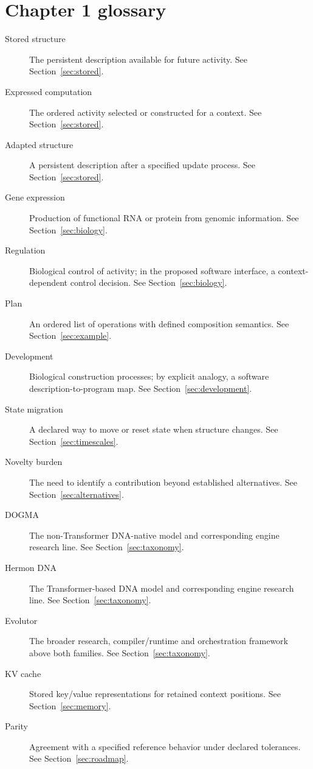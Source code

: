\chapter*{Chapter 1 glossary}
\begin{description}
\item[Stored structure] The persistent description available for future activity. See Section~\ref{sec:stored}.
\item[Expressed computation] The ordered activity selected or constructed for a context. See Section~\ref{sec:stored}.
\item[Adapted structure] A persistent description after a specified update process. See Section~\ref{sec:stored}.
\item[Gene expression] Production of functional RNA or protein from genomic information. See Section~\ref{sec:biology}.
\item[Regulation] Biological control of activity; in the proposed software interface, a context-dependent control decision. See Section~\ref{sec:biology}.
\item[Plan] An ordered list of operations with defined composition semantics. See Section~\ref{sec:example}.
\item[Development] Biological construction processes; by explicit analogy, a software description-to-program map. See Section~\ref{sec:development}.
\item[State migration] A declared way to move or reset state when structure changes. See Section~\ref{sec:timescales}.
\item[Novelty burden] The need to identify a contribution beyond established alternatives. See Section~\ref{sec:alternatives}.
\item[DOGMA] The non-Transformer DNA-native model and corresponding engine research line. See Section~\ref{sec:taxonomy}.
\item[Hermon DNA] The Transformer-based DNA model and corresponding engine research line. See Section~\ref{sec:taxonomy}.
\item[Evolutor] The broader research, compiler/runtime and orchestration framework above both families. See Section~\ref{sec:taxonomy}.
\item[KV cache] Stored key/value representations for retained context positions. See Section~\ref{sec:memory}.
\item[Parity] Agreement with a specified reference behavior under declared tolerances. See Section~\ref{sec:roadmap}.
\end{description}
